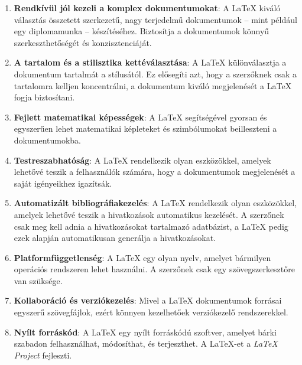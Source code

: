 \begin{enumerate}
	\item \textbf{Rendkívül jól kezeli a komplex dokumentumokat}:
	      A \LaTeX{} kiváló választás összetett szerkezetű, nagy terjedelmű
	      dokumentumok -- mint például egy diplomamunka -- készítéséhez.
	      Biztosítja a dokumentumok könnyű szerkeszthetőségét és
	      konzisztenciáját.

	\item \textbf{A tartalom és a stilisztika kettéválasztása}:
	      A \LaTeX{} különválasztja a dokumentum tartalmát a stílusától. Ez
	      elősegíti azt, hogy a szerzőknek csak a tartalomra kelljen koncentrálni,
	      a dokumentum kiváló megjelenését a \LaTeX{} fogja biztosítani.

	\item \textbf{Fejlett matematikai képességek}:
	      A \LaTeX{} segítségével gyorsan és egyszerűen lehet matematikai
	      képleteket és szimbólumokat beilleszteni a dokumentumokba.

	\item \textbf{Testreszabhatóság}:
	      A \LaTeX{} rendelkezik olyan eszközökkel, amelyek lehetővé teszik a
	      felhasználók számára, hogy a dokumentumok megjelenését a saját
	      igényeikhez igazítsák.

	\item \textbf{Automatizált bibliográfiakezelés}:
	      A \LaTeX{} rendelkezik olyan eszközökkel, amelyek lehetővé teszik a
	      hivatkozások automatikus kezelését. A szerzőnek csak meg kell adnia a
	      hivatkozásokat tartalmazó adatbázist, a \LaTeX{} pedig ezek alapján
	      automatikusan generálja a hivatkozásokat.

	\item \textbf{Platformfüggetlenség}:
	      A \LaTeX{} egy olyan nyelv, amelyet bármilyen operációs rendszeren
	      lehet használni. A szerzőnek csak egy szövegszerkesztőre van szüksége.

	\item \textbf{Kollaboráció és verziókezelés}:
	      Mivel a \LaTeX{} dokumentumok forrásai egyszerű szövegfájlok, ezért
	      könnyen kezelhetőek verziókezelő rendszerekkel.

	\item \textbf{Nyílt forráskód}:
	      A \LaTeX{} egy nyílt forráskódú szoftver, amelyet bárki szabadon
	      felhasználhat, módosíthat, és terjeszthet. A \LaTeX{}-et a
	      \textit{\LaTeX{} Project} fejleszti. \cite{latex_project}
\end{enumerate}

